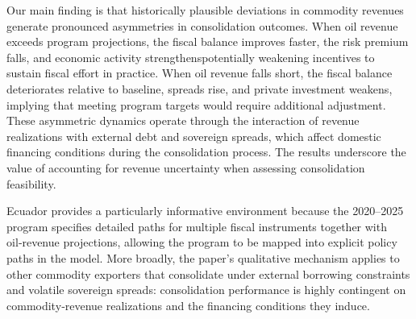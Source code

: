 \documentclass[12pt]{article}
\begin{document}
Our main finding is that historically plausible deviations in commodity revenues generate pronounced asymmetries in consolidation outcomes. When oil revenue exceeds program projections, the fiscal balance improves faster, the risk premium falls, and economic activity strengthens\textemdash potentially weakening incentives to sustain fiscal effort in practice. When oil revenue falls short, the fiscal balance deteriorates relative to baseline, spreads rise, and private investment weakens, implying that meeting program targets would require additional adjustment. These asymmetric dynamics operate through the interaction of revenue realizations with external debt and sovereign spreads, which affect domestic financing conditions during the consolidation process. The results underscore the value of accounting for revenue uncertainty when assessing consolidation feasibility.

Ecuador provides a particularly informative environment because the 2020–2025 program specifies detailed paths for multiple fiscal instruments together with oil‑revenue projections, allowing the program to be mapped into explicit policy paths in the model. More broadly, the paper’s qualitative mechanism applies to other commodity exporters that consolidate under external borrowing constraints and volatile sovereign spreads: consolidation performance is highly contingent on commodity‑revenue realizations and the financing conditions they induce.
\end{document}
